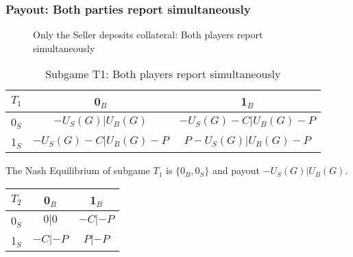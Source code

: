 \documentclass{cacthesis}
\begin{document}
\subsubsection{Payout: Both parties report simultaneously}
\begin{figure}[htb!]
    \centering
    \caption{Only the Seller deposits collateral: Both players report simultaneously}
\end{figure}

\begin{table}[htb!]
    \centering
    \begin{tabular}{ c||c|c| }
    $T_1$& 0$_B$ & 1$_B$   \\
    \hline
    \hline
    0$_S$ & $-U_S(G) | U_B(G)$ & $-U_S(G) - C | U_B(G) - P$ \\
    \hline
    1$_S$ & $-U_S(G) - C | U_B(G) - P$ & $P - U_S(G) | U_B(G) - P$\\ 
    \hline
    \end{tabular}
    \caption{Subgame T1: Both players report simultaneously}
\end{table}

The Nash Equilibrium of subgame $T_1$ is $\{0_B, 0_S\}$ and payout $-U_S(G) | U_B(G)$.
\begin{center}
    \begin{tabular}{ c||c|c| }
    $T_2$& 0$_B$ & 1$_B$   \\
    \hline
    \hline
    0$_S$ & $0 | 0$ & $-C|-P$ \\
    \hline
    1$_S$ & $-C|-P$ & $P | -P$\\ 
    \hline
    \end{tabular}
\end{center}
\end{document}
